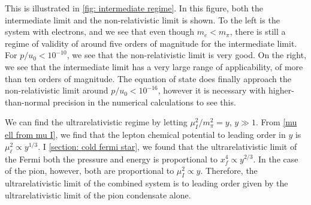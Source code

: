 This is illustrated in \autoref{fig: intermediate regime}.
In this figure, both the intermediate limit and the non-relativistic limit is shown.
To the left is the system with electrons, and we see that even though $m_e < m_\pi$, there is still a regime of validity of around five orders of magnitude for the intermediate limit.
For $p/u_0 < 10^{-10}$, we see that the non-relativistic limit is very good.
On the right, we see that the intermediate limit has a very large range of applicability, of more than ten orders of magnitude.
The equation of state does finally approach the non-relativistic limit around $p/u_0 < 10^{-16}$, however it is necessary with higher-than-normal precision in the numerical calculations to see this.
 
We can find the ultrarelativistic regime by letting $\mu_I^2/m_\pi^2 = y$, $y \gg 1$.
From \autoref{mu ell from mu I}, we find that the lepton chemical potential to leading order in $y$ is $\mu_\ell^2 \propto y^{1/3}$.
I \autoref{section: cold fermi star}, we found that the ultrarelativistic limit of the Fermi both the pressure and energy is proportional to $x_f^4 \propto y^{2/3}$.
In the case of the pion, however, both are proportional to $\mu_I^2 \propto y$.
Therefore, the ultrarelativistic limit of the combined system is to leading order given by the ultrarelativistic limit of the pion condensate alone.

